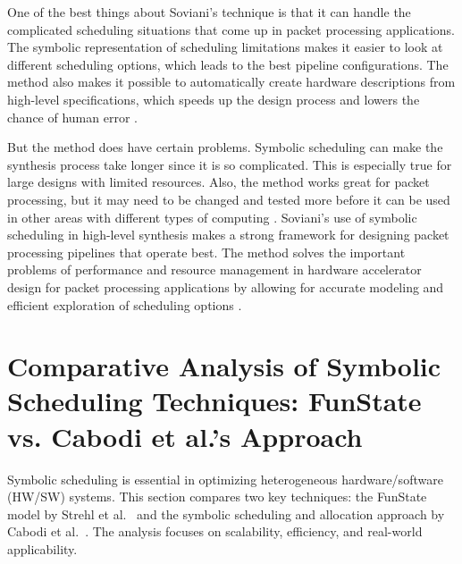 \documentclass[conference]{IEEEtran}
\begin{document}
 One of the best things about Soviani's technique is that it can handle the complicated scheduling situations that come up in packet processing applications.  The symbolic representation of scheduling limitations makes it easier to look at different scheduling options, which leads to the best pipeline configurations.  The method also makes it possible to automatically create hardware descriptions from high-level specifications, which speeds up the design process and lowers the chance of human error \cite{soviani2007high}.

 But the method does have certain problems.  Symbolic scheduling can make the synthesis process take longer since it is so complicated. This is especially true for large designs with limited resources.  Also, the method works great for packet processing, but it may need to be changed and tested more before it can be used in other areas with different types of computing \cite{soviani2007high}.
  Soviani's use of symbolic scheduling in high-level synthesis makes a strong framework for designing packet processing pipelines that operate best.  The method solves the important problems of performance and resource management in hardware accelerator design for packet processing applications by allowing for accurate modeling and efficient exploration of scheduling options \cite{soviani2007high}.

\section{\textbf{Comparative Analysis of Symbolic Scheduling Techniques: FunState vs. Cabodi et al.'s Approach}}

Symbolic scheduling is essential in optimizing heterogeneous hardware/software (HW/SW) systems. This section compares two key techniques: the FunState model by Strehl et al.~\cite{strehl1999scheduling} and the symbolic scheduling and allocation approach by Cabodi et al.~\cite{cabodi2002symbolic}. The analysis focuses on scalability, efficiency, and real-world applicability.
\end{document}
